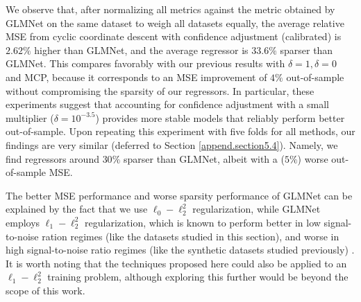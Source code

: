 \documentclass[mnsc,nonblindrev]{informs3} %
\let\footnote=\endnote
\begin{document}
We observe that, after normalizing all metrics against the metric obtained by GLMNet on the same dataset to weigh all datasets equally, the average %
relative MSE from cyclic coordinate descent with confidence adjustment (calibrated) is $2.62\%$ higher than GLMNet, and the average regressor is $33.6\%$ sparser than GLMNet. This compares favorably with our previous results with $\delta=1, \delta =0$ and MCP, because it corresponds to an MSE improvement of  $4\%$ out-of-sample without compromising the sparsity of our regressors. In particular, these experiments suggest that accounting for confidence adjustment with a small multiplier ($\delta=10^{-3.5}$) provides more stable models that reliably perform better out-of-sample. Upon repeating this experiment with five folds for all methods, our findings are very similar (deferred to Section \ref{append.section5.4}). Namely, we find regressors around $30\%$ sparser than GLMNet, albeit with a ($5\%$) worse out-of-sample MSE. 

The better MSE performance and worse sparsity performance of GLMNet can be explained by the fact that we use $\ell_0-\ell_2^2$ regularization, while GLMNet employs $\ell_1-\ell_2^2$ regularization, which is known to perform better in low signal-to-noise ration regimes (like the datasets studied in this section), and worse in high signal-to-noise ratio regimes (like the synthetic datasets studied previously) \citep{hastie2020best}. It is worth noting that the techniques proposed here could also be applied to an $\ell_1-\ell_2^2$ training problem, although exploring this further would be beyond the scope of this work.


\end{document}
